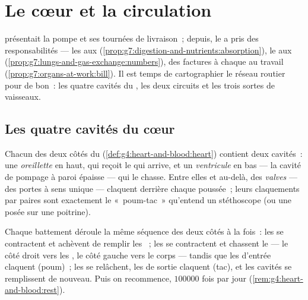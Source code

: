 \chapter{Le cœur et la circulation}\label{ch:g7:heart-and-circulation}

 présentait la pompe et ses tournées de
livraison~; depuis, le  a pris des responsabilités --- les
 aux 
(\cref{prop:g7:digestion-and-nutrients:absorption}), le 
aux 
(\cref{prop:g7:lungs-and-gas-exchange:numbers}), des factures à
chaque  au travail (\cref{prop:g7:organs-at-work:bill}). Il
est temps de cartographier le réseau routier pour de bon~: les
quatre cavités du , les deux circuits et les trois sortes de
vaisseaux.

\section{Les quatre cavités du cœur}

\begin{definition}\label{def:g7:heart-and-circulation:rooms}
Chacun des deux côtés du 
(\cref{def:g4:heart-and-blood:heart}) contient deux cavités~: une
\emph{oreillette} en haut, qui reçoit le  qui
arrive, et un \emph{ventricule} en bas --- la
cavité de pompage à paroi épaisse --- qui le chasse. Entre elles et
au-delà, des \emph{valves} --- des portes à sens
unique --- claquent derrière chaque poussée~; leurs claquements par
paires sont exactement le «~poum-tac~» qu'entend un stéthoscope (ou
une  posée sur une poitrine).
\end{definition}

\begin{proposition}\label{prop:g7:heart-and-circulation:beat}
Chaque battement déroule la même séquence des deux côtés à la fois~:
les  se contractent et achèvent de remplir les
~; les  se contractent et chassent le  ---
le côté droit vers les , le côté gauche vers le corps ---
tandis que les  d'entrée claquent (poum)~; les  se
relâchent, les  de sortie claquent (tac), et les cavités se
remplissent de nouveau. Puis on recommence, $100000$ fois par jour
(\cref{rem:g4:heart-and-blood:rest}).
\end{proposition}
\admitted

